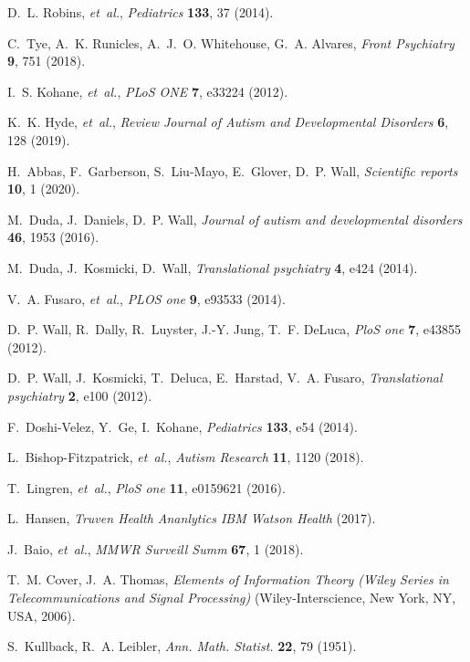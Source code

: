\documentclass[onecolumn,,10pt]{IEEEtran}
\begin{document}
\begin{thebibliography}{10}
D.~L. Robins, {\it et~al.\/}, {\it Pediatrics\/} {\bf 133}, 37 (2014).

C.~Tye, A.~K. Runicles, A.~J.~O. Whitehouse, G.~A. Alvares, {\it Front
  Psychiatry\/} {\bf 9}, 751 (2018).

I.~S. Kohane, {\it et~al.\/}, {\it PLoS ONE\/} {\bf 7}, e33224 (2012).

K.~K. Hyde, {\it et~al.\/}, {\it Review Journal of Autism and Developmental
  Disorders\/} {\bf 6}, 128 (2019).

H.~Abbas, F.~Garberson, S.~Liu-Mayo, E.~Glover, D.~P. Wall, {\it Scientific
  reports\/} {\bf 10}, 1 (2020).

M.~Duda, J.~Daniels, D.~P. Wall, {\it Journal of autism and developmental
  disorders\/} {\bf 46}, 1953 (2016).

M.~Duda, J.~Kosmicki, D.~Wall, {\it Translational psychiatry\/} {\bf 4}, e424
  (2014).

V.~A. Fusaro, {\it et~al.\/}, {\it PLOS one\/} {\bf 9}, e93533 (2014).

D.~P. Wall, R.~Dally, R.~Luyster, J.-Y. Jung, T.~F. DeLuca, {\it PloS one\/}
  {\bf 7}, e43855 (2012).

D.~P. Wall, J.~Kosmicki, T.~Deluca, E.~Harstad, V.~A. Fusaro, {\it
  Translational psychiatry\/} {\bf 2}, e100 (2012).

F.~Doshi-Velez, Y.~Ge, I.~Kohane, {\it Pediatrics\/} {\bf 133}, e54 (2014).

L.~Bishop-Fitzpatrick, {\it et~al.\/}, {\it Autism Research\/} {\bf 11}, 1120
  (2018).

T.~Lingren, {\it et~al.\/}, {\it PloS one\/} {\bf 11}, e0159621 (2016).

L.~Hansen, {\it Truven Health Ananlytics IBM Watson Health\/}  (2017).

J.~Baio, {\it et~al.\/}, {\it MMWR Surveill Summ\/} {\bf 67}, 1 (2018).

T.~M. Cover, J.~A. Thomas, {\it Elements of Information Theory (Wiley Series in
  Telecommunications and Signal Processing)\/} (Wiley-Interscience, New York,
  NY, USA, 2006).

S.~Kullback, R.~A. Leibler, {\it Ann. Math. Statist.\/} {\bf 22}, 79 (1951).


\end{thebibliography}
\end{document}
